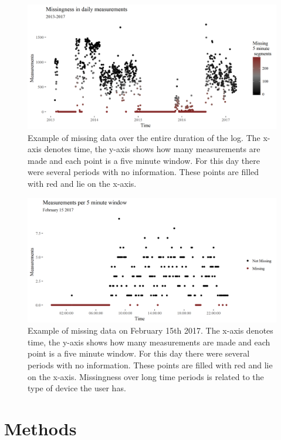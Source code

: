 \documentclass[english,man]{apa6}
\theoremstyle{definition}
\theoremstyle{definition}
\theoremstyle{definition}
\theoremstyle{remark}
\begin{document}
\begin{figure}
\includegraphics[width=1\linewidth]{img/missingdayBoaz5min} \caption{Example of missing data over the entire duration of the log. The x-axis denotes time, the y-axis shows how many measurements are made and each point is a five minute window. For this day there were several periods with no information. These points are filled with red and lie on the x-axis.}\label{fig:longMeasurementsPerDay}
\end{figure}

\begin{figure}
\includegraphics[width=1\linewidth]{img/missingBoaz5minExample} \caption{Example of missing data on February 15th 2017. The x-axis denotes time, the y-axis shows how many measurements are made and each point is a five minute window. For this day there were several periods with no information. These points are filled with red and lie on the x-axis. Missingness over long time periods is related to the type of device the user has.}\label{fig:measurementsPerDay}
\end{figure}

\section{Methods}\label{methods}
\end{document}
